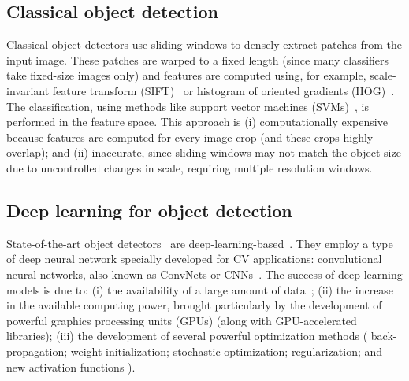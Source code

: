 \subsection{Classical object detection}

Classical object detectors use sliding windows to densely extract patches from the input image.
These patches are warped to a fixed length (since many classifiers take fixed-size images only) and features are computed using, for example, scale-invariant feature transform
(SIFT)~\cite{Lowe2004}
or
histogram of oriented gradients (HOG)~\cite{dalal2005}.
The classification, using methods like support vector machines (SVMs)~\cite{Boser1992},
is performed in the feature space.
This approach is (i) computationally expensive because features are computed for every image crop (and these crops highly overlap); and
(ii) inaccurate, since sliding windows may not match the object size due to uncontrolled changes in scale, requiring multiple resolution windows.

\subsection{Deep learning for object detection}

State-of-the-art object detectors~\cite{Sermanet2014, Redmon2016, Ren2017fasterpami} are deep-learning-based~\cite{goodfellow2016}.
They employ a type of deep neural network specially developed for CV applications: convolutional neural networks, also known as ConvNets or CNNs~\cite{LeCun1989}.
The success of deep learning models is due to: (i) the availability of a large amount of data~\cite{Krizhevsky2012, Russakovsky2015};
(ii) the increase in the available computing power, brought particularly by the development of powerful graphics processing units (GPUs) (along with GPU-accelerated libraries);
(iii) the development of several powerful optimization methods (\eg
back-propagation;%
weight initialization;%
stochastic optimization;%
regularization; and %
new activation functions%
).

